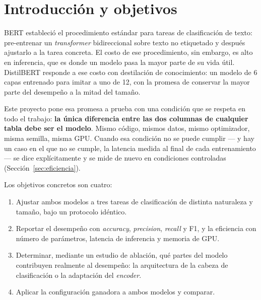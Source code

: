 \section{Introducción y objetivos}

BERT \cite{devlin2019bert} estableció el procedimiento estándar para tareas
de clasificación de texto: pre-entrenar un \textit{transformer} bidireccional
sobre texto no etiquetado y después ajustarlo a la tarea concreta. El costo de
ese procedimiento, sin embargo, es alto en inferencia, que es donde un modelo
pasa la mayor parte de su vida útil. DistilBERT \cite{sanh2019distilbert}
responde a ese costo con destilación de conocimiento: un modelo de 6 capas
entrenado para imitar a uno de 12, con la promesa de conservar la mayor parte
del desempeño a la mitad del tamaño.

Este proyecto pone esa promesa a prueba con una condición que se respeta en
todo el trabajo: \textbf{la única diferencia entre las dos columnas de
cualquier tabla debe ser el modelo}. Mismo código, mismos datos, mismo
optimizador, misma semilla, misma GPU. Cuando esa condición no se puede
cumplir --- y hay un caso en el que no se cumple, la latencia medida al final
de cada entrenamiento --- se dice explícitamente y se mide de nuevo en
condiciones controladas (Sección~\ref{sec:eficiencia}).

Los objetivos concretos son cuatro:

\begin{enumerate}
  \item Ajustar ambos modelos a tres tareas de clasificación de distinta
        naturaleza y tamaño, bajo un protocolo idéntico.
  \item Reportar el desempeño con \textit{accuracy}, \textit{precision},
        \textit{recall} y F1, y la eficiencia con número de parámetros,
        latencia de inferencia y memoria de GPU.
  \item Determinar, mediante un estudio de ablación, qué partes del modelo
        contribuyen realmente al desempeño: la arquitectura de la cabeza de
        clasificación o la adaptación del \textit{encoder}.
  \item Aplicar la configuración ganadora a ambos modelos y comparar.
\end{enumerate}
